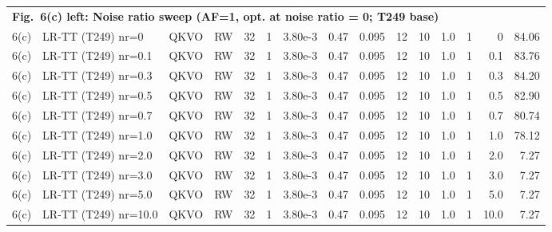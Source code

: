 \documentclass[AMA,LATO1COL]{WileyNJDv5}
\begin{document}
{\begin{longtable}{@{}l l l l r r r r r r r r r r r@{}}
\multicolumn{15}{l}{\cellcolor{HeadGray}\textbf{Fig.~6(c) left: Noise ratio sweep (AF=1, opt. at noise ratio = 0; T249 base)}} \\
6(c) & LR-TT (T249) nr=0 & QKVO & RW & 32 & 1 & 3.80e-3 & 0.47 & 0.095 & 12 & 10 & 1.0 & 1 & 0 & 84.06 \\
6(c) & LR-TT (T249) nr=0.1 & QKVO & RW & 32 & 1 & 3.80e-3 & 0.47 & 0.095 & 12 & 10 & 1.0 & 1 & 0.1 & 83.76 \\
6(c) & LR-TT (T249) nr=0.3 & QKVO & RW & 32 & 1 & 3.80e-3 & 0.47 & 0.095 & 12 & 10 & 1.0 & 1 & 0.3 & 84.20 \\
6(c) & LR-TT (T249) nr=0.5 & QKVO & RW & 32 & 1 & 3.80e-3 & 0.47 & 0.095 & 12 & 10 & 1.0 & 1 & 0.5 & 82.90 \\
6(c) & LR-TT (T249) nr=0.7 & QKVO & RW & 32 & 1 & 3.80e-3 & 0.47 & 0.095 & 12 & 10 & 1.0 & 1 & 0.7 & 80.74 \\
6(c) & LR-TT (T249) nr=1.0 & QKVO & RW & 32 & 1 & 3.80e-3 & 0.47 & 0.095 & 12 & 10 & 1.0 & 1 & 1.0 & 78.12 \\
6(c) & LR-TT (T249) nr=2.0 & QKVO & RW & 32 & 1 & 3.80e-3 & 0.47 & 0.095 & 12 & 10 & 1.0 & 1 & 2.0 & 7.27 \\
6(c) & LR-TT (T249) nr=3.0 & QKVO & RW & 32 & 1 & 3.80e-3 & 0.47 & 0.095 & 12 & 10 & 1.0 & 1 & 3.0 & 7.27 \\
6(c) & LR-TT (T249) nr=5.0 & QKVO & RW & 32 & 1 & 3.80e-3 & 0.47 & 0.095 & 12 & 10 & 1.0 & 1 & 5.0 & 7.27 \\
6(c) & LR-TT (T249) nr=10.0 & QKVO & RW & 32 & 1 & 3.80e-3 & 0.47 & 0.095 & 12 & 10 & 1.0 & 1 & 10.0 & 7.27 \\
\midrule


\end{longtable}}
\end{document}
